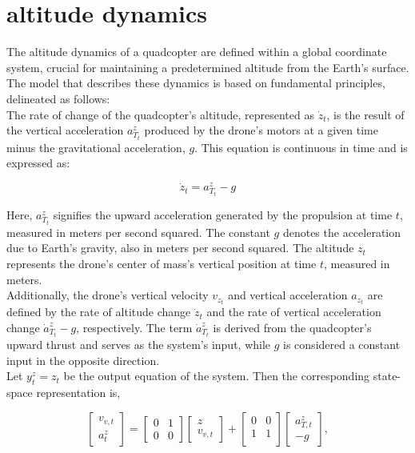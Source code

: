 \documentclass{article}
\begin{document}
\newpage
\section{altitude dynamics}
The altitude dynamics of a quadcopter are defined within a global coordinate system, crucial for maintaining a predetermined altitude from the Earth's surface. The model that describes these dynamics is based on fundamental principles, delineated as follows:
\\

\noindent
The rate of change of the quadcopter's altitude, represented as \( \dot{z}_t \), is the result of the vertical acceleration \( a^z_{T_t} \) produced by the drone's motors at a given time minus the gravitational acceleration, \( g \). This equation is continuous in time and is expressed as:

\begin{equation}
\dot{z}_t = a^z_{T_t} - g
\end{equation}

\noindent
Here, \( a^z_{T_t} \) signifies the upward acceleration generated by the propulsion at time \( t \), measured in meters per second squared. The constant \( g \) denotes the acceleration due to Earth's gravity, also in meters per second squared. The altitude \( z_t \) represents the drone's center of mass's vertical position at time \( t \), measured in meters.
\\

\noindent
Additionally, the drone's vertical velocity \( v_{z_t} \) and vertical acceleration \( a_{z_t} \) are defined by the rate of altitude change \( \dot{z}_t \) and the rate of vertical acceleration change \( \dot{a}^z_{T_t} - g \), respectively. The term \( \dot{a}^z_{T_t} \) is derived from the quadcopter's upward thrust and serves as the system's input, while \( g \) is considered a constant input in the opposite direction.
\\

\noindent
Let \( y_{t}^z = z_t \) be the output equation of the system. Then the corresponding state-space representation is,

\begin{equation}
\begin{bmatrix}
v_{v,t}\\
a_{t}^z
\end{bmatrix} =
\begin{bmatrix}
0 & 1 \\
0 & 0 
\end{bmatrix}
\begin{bmatrix}
z\\
v_{v,t}
\end{bmatrix} + 
\begin{bmatrix}
0 & 0 \\
1 & 1 \\ 
\end{bmatrix}
\begin{bmatrix}
a_{T,t}^z \\ 
-g
\end{bmatrix},
\end{equation}
\\
\end{document}
